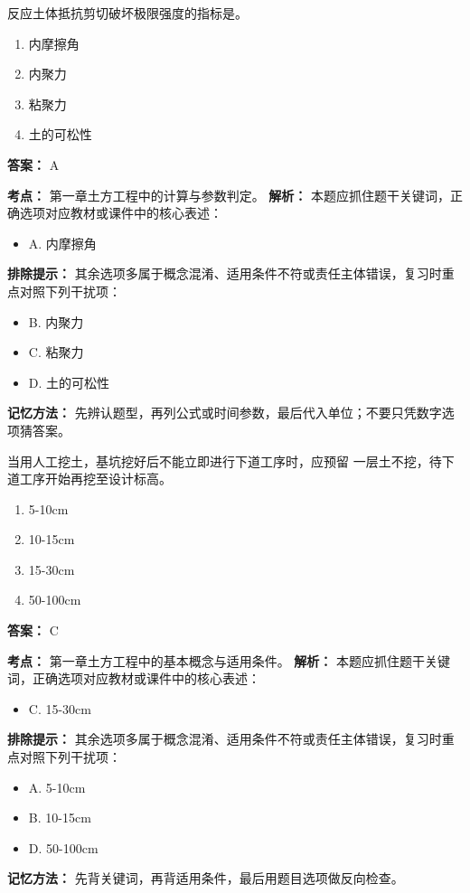 \documentclass[UTF8,fontset=fandol,11pt]{ctexart}
\begin{document}
\begin{quizbox}[title={第 29 题}]
反应土体抵抗剪切破坏极限强度的指标是。\\
\begin{enumerate}[label=\Alph*.]
\item 内摩擦角
\item 内聚力
\item 粘聚力
\item 土的可松性
\end{enumerate}
\textbf{答案：} A
\vspace{0.25em}
\begin{answerbox}[title={考点解析}]
\textbf{考点：} 第一章土方工程中的计算与参数判定。
\textbf{解析：} 本题应抓住题干关键词，正确选项对应教材或课件中的核心表述：
\begin{itemize}
\item A. 内摩擦角
\end{itemize}
\textbf{排除提示：} 其余选项多属于概念混淆、适用条件不符或责任主体错误，复习时重点对照下列干扰项：
\begin{itemize}
\item B. 内聚力
\item C. 粘聚力
\item D. 土的可松性
\end{itemize}
\textbf{记忆方法：} 先辨认题型，再列公式或时间参数，最后代入单位；不要只凭数字选项猜答案。
\end{answerbox}
\end{quizbox}

\vspace{0.2em}

\begin{quizbox}[title={第 30 题}]
当用人工挖土，基坑挖好后不能立即进行下道工序时，应预留 一层土不挖，待下道工序开始再挖至设计标高。\\
\begin{enumerate}[label=\Alph*.]
\item 5-10cm
\item 10-15cm
\item 15-30cm
\item 50-100cm
\end{enumerate}
\textbf{答案：} C
\vspace{0.25em}
\begin{answerbox}[title={考点解析}]
\textbf{考点：} 第一章土方工程中的基本概念与适用条件。
\textbf{解析：} 本题应抓住题干关键词，正确选项对应教材或课件中的核心表述：
\begin{itemize}
\item C. 15-30cm
\end{itemize}
\textbf{排除提示：} 其余选项多属于概念混淆、适用条件不符或责任主体错误，复习时重点对照下列干扰项：
\begin{itemize}
\item A. 5-10cm
\item B. 10-15cm
\item D. 50-100cm
\end{itemize}
\textbf{记忆方法：} 先背关键词，再背适用条件，最后用题目选项做反向检查。
\end{answerbox}
\end{quizbox}
\end{document}
